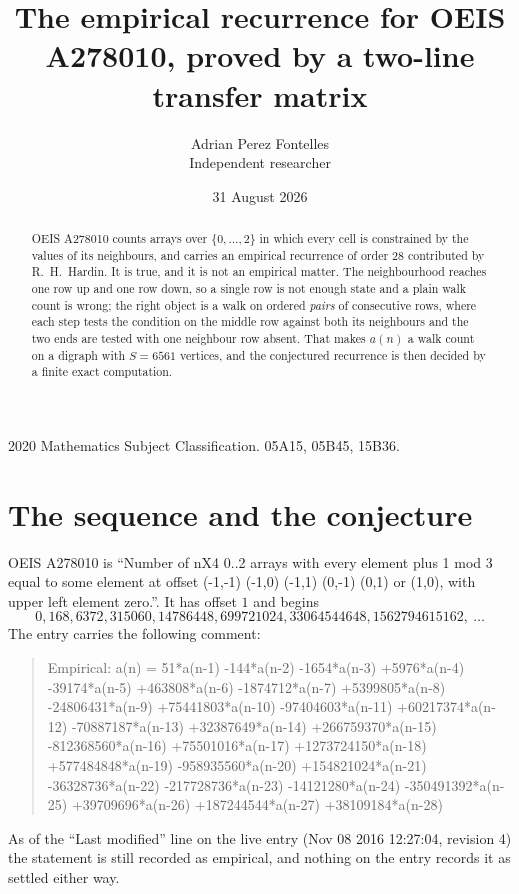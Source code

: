 \documentclass[11pt,a4paper]{article}
\title{The empirical recurrence for OEIS A278010, proved by a two-line transfer matrix}
\author{Adrian Perez Fontelles\\ \small Independent researcher}
\date{31 August 2026}
\theoremstyle{plain}
\theoremstyle{definition}
\begin{document}
\maketitle

\begin{abstract}
OEIS A278010 counts arrays over $\{0,\dots,2\}$ in which every cell is constrained by the
values of its neighbours, and carries an empirical recurrence of order $28$ contributed
by R.~H.~Hardin. It is true, and it is not an empirical matter. The neighbourhood reaches one
row up and one row down, so a single row is not enough state and a plain walk count
is wrong; the right object is a walk on ordered \emph{pairs} of consecutive rows, where
each step tests the condition on the middle row against both its neighbours and the two
ends are tested with one neighbour row absent. That makes $a(n)$ a walk count on a digraph
with $S=6561$ vertices, and the conjectured recurrence is then decided by a finite exact
computation.
\end{abstract}

\noindent\small 2020 Mathematics Subject Classification. 05A15, 05B45, 15B36.\normalsize

\section{The sequence and the conjecture}

OEIS A278010 is ``Number of nX4 0..2 arrays with every element plus 1 mod 3 equal to some element at offset (-1,-1) (-1,0) (-1,1) (0,-1) (0,1) or (1,0), with upper left element zero.''. It has offset $1$ and begins
\[
0, 168, 6372, 315060, 14786448, 699721024, 33064544648, 1562794615162,\ \dots
\]
The entry carries the following comment:
\begin{quote}\small
Empirical: a(n) = 51*a(n-1) -144*a(n-2) -1654*a(n-3) +5976*a(n-4) -39174*a(n-5) +463808*a(n-6) -1874712*a(n-7) +5399805*a(n-8) -24806431*a(n-9) +75441803*a(n-10) -97404603*a(n-11) +60217374*a(n-12) -70887187*a(n-13) +32387649*a(n-14) +266759370*a(n-15) -812368560*a(n-16) +75501016*a(n-17) +1273724150*a(n-18) +577484848*a(n-19) -958935560*a(n-20) +154821024*a(n-21) -36328736*a(n-22) -217728736*a(n-23) -14121280*a(n-24) -350491392*a(n-25) +39709696*a(n-26) +187244544*a(n-27) +38109184*a(n-28)
\end{quote}
As of the ``Last modified'' line on the live entry (Nov 08 2016 12:27:04, revision 4) the statement is
still recorded as empirical, and nothing on the entry records it as settled either way.
\end{document}

